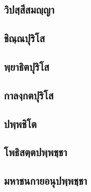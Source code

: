\documentclass[
]{book}
\begin{document}
\hypertarget{uxe27uxe34uxe1buxe2auxe3auxe2auxe35uxe2auxe21uxe0duxe3auxe0duxe32}{%
\subsection{วิปสฺสีสมญฺญา}\label{uxe27uxe34uxe1buxe2auxe3auxe2auxe35uxe2auxe21uxe0duxe3auxe0duxe32}}

\hypertarget{uxe0auxe34uxe13uxe3auxe13uxe1buxe38uxe23uxe34uxe42uxe2a}{%
\subsection{ชิณฺณปุริโส}\label{uxe0auxe34uxe13uxe3auxe13uxe1buxe38uxe23uxe34uxe42uxe2a}}

\hypertarget{uxe1euxe3auxe22uxe32uxe18uxe34uxe15uxe1buxe38uxe23uxe34uxe42uxe2a}{%
\subsection{พฺยาธิตปุริโส}\label{uxe1euxe3auxe22uxe32uxe18uxe34uxe15uxe1buxe38uxe23uxe34uxe42uxe2a}}

\hypertarget{uxe01uxe32uxe25uxe07uxe3auxe01uxe15uxe1buxe38uxe23uxe34uxe42uxe2a}{%
\subsection{กาลงฺกตปุริโส}\label{uxe01uxe32uxe25uxe07uxe3auxe01uxe15uxe1buxe38uxe23uxe34uxe42uxe2a}}

\hypertarget{uxe1buxe1euxe3auxe1euxe0auxe34uxe42uxe15}{%
\subsection{ปพฺพชิโต}\label{uxe1buxe1euxe3auxe1euxe0auxe34uxe42uxe15}}

\hypertarget{uxe42uxe1euxe18uxe34uxe2auxe15uxe3auxe15uxe1buxe1euxe3auxe1euxe0auxe3auxe0auxe32}{%
\subsection{โพธิสตฺตปพฺพชฺชา}\label{uxe42uxe1euxe18uxe34uxe2auxe15uxe3auxe15uxe1buxe1euxe3auxe1euxe0auxe3auxe0auxe32}}

\hypertarget{uxe21uxe2buxe32uxe0auxe19uxe01uxe32uxe22uxe2duxe19uxe38uxe1buxe1euxe3auxe1euxe0auxe3auxe0auxe32}{%
\subsection{มหาชนกายอนุปพฺพชฺชา}\label{uxe21uxe2buxe32uxe0auxe19uxe01uxe32uxe22uxe2duxe19uxe38uxe1buxe1euxe3auxe1euxe0auxe3auxe0auxe32}}
\end{document}
